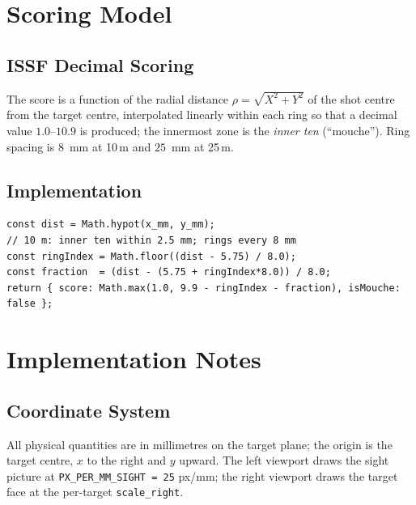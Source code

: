 \documentclass[11pt]{article}
\newcommand{\code}[1]{\texttt{#1}}
\begin{document}
\section{Scoring Model}\label{sec:scoring}

\subsection{ISSF Decimal Scoring}

The score is a function of the radial distance $\rho = \sqrt{X^2+Y^2}$ of
the shot centre from the target centre, interpolated linearly within each
ring so that a decimal value $1.0$--$10.9$ is produced; the innermost zone
is the \emph{inner ten} (``mouche'').  Ring spacing is $8$~mm at 10\,m and
$25$~mm at 25\,m.

\subsection{Implementation}

\begin{lstlisting}
const dist = Math.hypot(x_mm, y_mm);
// 10 m: inner ten within 2.5 mm; rings every 8 mm
const ringIndex = Math.floor((dist - 5.75) / 8.0);
const fraction  = (dist - (5.75 + ringIndex*8.0)) / 8.0;
return { score: Math.max(1.0, 9.9 - ringIndex - fraction), isMouche: false };
\end{lstlisting}

\section{Implementation Notes}\label{sec:implementation}

\subsection{Coordinate System}

All physical quantities are in millimetres on the target plane; the origin
is the target centre, $x$ to the right and $y$ upward.  The left viewport
draws the sight picture at \code{PX\_PER\_MM\_SIGHT = 25} px/mm; the right
viewport draws the target face at the per-target \code{scale\_right}.
\end{document}
